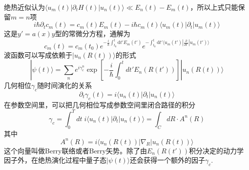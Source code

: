 \documentclass{article}
\numberwithin{equation}{subsection}
\begin{document}
绝热近似认为$\langle u_m(t)|\partial_tH(t)|u_n(t)\rangle\ll E_n(t)-E_m(t)$，所以上式只能保留$m=n$项
\begin{equation}
    i\hbar\partial_t c_m(t)=c_m(t)E_m(t)-i\hbar c_m(t)\langle u_m(t)|\partial_t|u_m(t)\rangle
\end{equation}
这是$y'=a(x)y$型的常微分方程，通解为
\begin{equation}
    c_m(t)=c_m(t_0)e^{-\frac{i}{\hbar}\int_{t_0}^{t}\mathrm{d}t'E_m(t')}e^{-\int_{t_0}^{t}\mathrm{d}t'\langle u_m(t')|\frac{\partial}{\partial t'}|u_m(t')\rangle}
\end{equation}
波函数可以写成依赖于$|u_n(R(t))\rangle$的形式
\begin{equation}
    |\psi(t)\rangle=\sum_{n}e^{i\gamma_c^n}\exp\left[-\frac{i}{\hbar}\int_{0}^{t}dt'E_n(R(t'))\right]|u_n(R(t))\rangle
\end{equation}
几何相位$\gamma_c$随时间演化的关系
\begin{equation}
    \partial_t\gamma_c(t)=i\langle u_n(t)|\partial_t|u_n(t)\rangle
\end{equation}
在参数空间里，可以把几何相位写成参数空间里闭合路径的积分
\begin{equation}
    \gamma_c=\int_0^Tdt\;i\langle u_n(t)|\partial_t|u_n(t)\rangle=\int_C dR\cdot A^n(R)
\end{equation}
其中
\begin{equation}
    A^n(R)=i\langle u_n(R(t))|\nabla_R|u_n(R(t))\rangle
\end{equation}
这个向量叫做Berry联络或者Berry矢势。除了由$E_n(R(t'))$积分决定的动力学因子外，在绝热演化过程中量子态$|\psi(t)\rangle$还会获得一个额外的因子$\gamma_c$.
\end{document}
